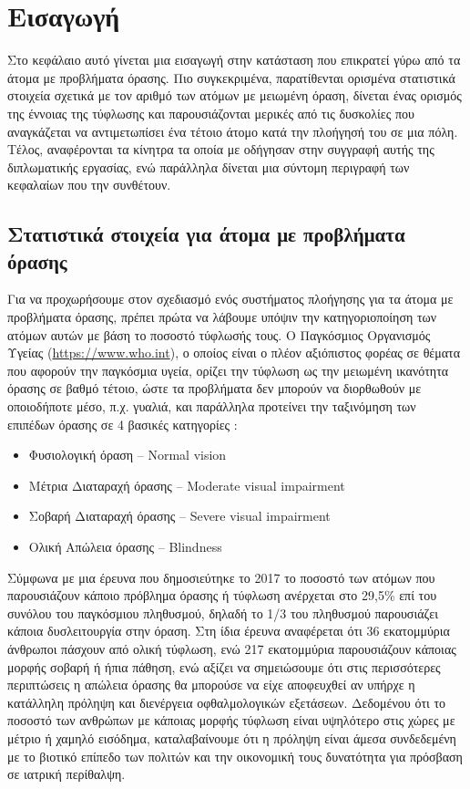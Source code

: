 
\chapter{Εισαγωγή}

Στο κεφάλαιο αυτό γίνεται μια εισαγωγή στην κατάσταση που επικρατεί γύρω από τα άτομα με προβλήματα όρασης. Πιο συγκεκριμένα, παρατίθενται ορισμένα στατιστικά στοιχεία σχετικά με τον αριθμό των ατόμων με μειωμένη όραση, δίνεται ένας ορισμός της έννοιας της τύφλωσης και παρουσιάζονται μερικές από τις δυσκολίες που αναγκάζεται να αντιμετωπίσει ένα τέτοιο άτομο κατά την πλοήγησή του σε μια πόλη. Τέλος, αναφέρονται τα κίνητρα τα οποία με οδήγησαν στην συγγραφή αυτής της διπλωματικής εργασίας, ενώ παράλληλα δίνεται μια σύντομη περιγραφή των κεφαλαίων που την συνθέτουν.

\section{Στατιστικά στοιχεία για άτομα με προβλήματα όρασης}
Για να προχωρήσουμε στον σχεδιασμό ενός συστήματος πλοήγησης για τα άτομα με προβλήματα όρασης, πρέπει πρώτα να λάβουμε υπόψιν την κατηγοριοποίηση των ατόμων αυτών με βάση το ποσοστό τύφλωσής τους. Ο Παγκόσμιος Οργανισμός Υγείας (\url{https://www.who.int}), ο οποίος είναι ο πλέον αξιόπιστος φορέας σε θέματα που αφορούν την παγκόσμια υγεία, ορίζει την τύφλωση ως την μειωμένη ικανότητα όρασης σε βαθμό τέτοιο, ώστε τα προβλήματα δεν μπορούν να διορθωθούν με οποιοδήποτε μέσο, π.χ. γυαλιά, και παράλληλα προτείνει την ταξινόμηση των επιπέδων όρασης σε 4 βασικές κατηγορίες \cite{world_health_organization}:
\begin{itemize}
    \item Φυσιολογική όραση – Normal vision
    \item Μέτρια Διαταραχή όρασης – Moderate visual impairment
    \item Σοβαρή Διαταραχή όρασης – Severe visual impairment
    \item Ολική Απώλεια όρασης – Blindness
\end{itemize}

Σύμφωνα με μια έρευνα που δημοσιεύτηκε το 2017 \cite{bourne2017magnitude} το ποσοστό των ατόμων που παρουσιάζουν κάποιο πρόβλημα όρασης ή τύφλωση ανέρχεται στο 29,5\% επί του συνόλου του παγκόσμιου πληθυσμού, δηλαδή το 1/3 του πληθυσμού παρουσιάζει κάποια δυσλειτουργία στην όραση. Στη ίδια έρευνα αναφέρεται ότι 36 εκατομμύρια άνθρωποι πάσχουν από ολική τύφλωση, ενώ 217 εκατομμύρια παρουσιάζουν κάποιας μορφής σοβαρή ή ήπια πάθηση, ενώ αξίζει να σημειώσουμε ότι στις περισσότερες περιπτώσεις η απώλεια όρασης θα μπορούσε να είχε αποφευχθεί αν υπήρχε η κατάλληλη πρόληψη και διενέργεια οφθαλμολογικών εξετάσεων. Δεδομένου ότι το ποσοστό των ανθρώπων με κάποιας μορφής τύφλωση είναι υψηλότερο στις χώρες με μέτριο ή χαμηλό εισόδημα, καταλαβαίνουμε ότι η πρόληψη είναι άμεσα συνδεδεμένη με το βιοτικό επίπεδο των πολιτών και την οικονομική τους δυνατότητα για πρόσβαση σε ιατρική περίθαλψη.

